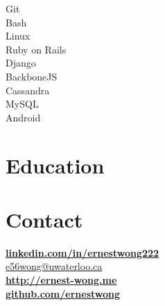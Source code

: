 \documentclass[]{deedy-resume}
\begin{document}
\begin{minipage}[t]{0.25\textwidth}
\textbullet{} Git \\
\textbullet{} Bash \\
\textbullet{} Linux \\
\textbullet{} Ruby on Rails \\
\textbullet{} Django \\
\textbullet{} BackboneJS \\
\textbullet{} Cassandra \\
\textbullet{} MySQL \\
\textbullet{} Android \\
\sectionsep



\section{Education}


\sectionsep


\section{Contact}
\href{https://www.linkedin.com/in/ernestwong222}{\bf linkedin.com/in/ernestwong222} \\
\href{mailto:e56wong@uwaterloo.ca}{e56wong@uwaterloo.ca}\\
\href{http://ernest-wong.me}{\bf http://ernest-wong.me} \\
\href{https://github.com/ernestwong}{\bf github.com/ernestwong} \\
\sectionsep




\end{minipage}
\end{document}
